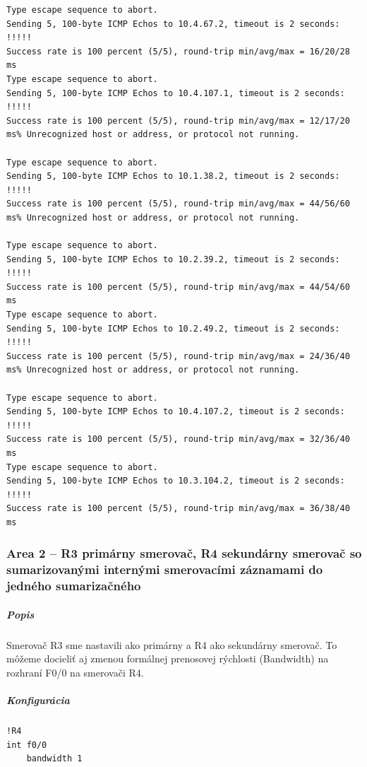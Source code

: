 \documentclass[12pt,twoside,a4paper]{article}
\begin{document}
{\begin{small}
\begin{verbatim}
Type escape sequence to abort.
Sending 5, 100-byte ICMP Echos to 10.4.67.2, timeout is 2 seconds:
!!!!!
Success rate is 100 percent (5/5), round-trip min/avg/max = 16/20/28 ms
Type escape sequence to abort.
Sending 5, 100-byte ICMP Echos to 10.4.107.1, timeout is 2 seconds:
!!!!!
Success rate is 100 percent (5/5), round-trip min/avg/max = 12/17/20 ms% Unrecognized host or address, or protocol not running.

Type escape sequence to abort.
Sending 5, 100-byte ICMP Echos to 10.1.38.2, timeout is 2 seconds:
!!!!!
Success rate is 100 percent (5/5), round-trip min/avg/max = 44/56/60 ms% Unrecognized host or address, or protocol not running.

Type escape sequence to abort.
Sending 5, 100-byte ICMP Echos to 10.2.39.2, timeout is 2 seconds:
!!!!!
Success rate is 100 percent (5/5), round-trip min/avg/max = 44/54/60 ms
Type escape sequence to abort.
Sending 5, 100-byte ICMP Echos to 10.2.49.2, timeout is 2 seconds:
!!!!!
Success rate is 100 percent (5/5), round-trip min/avg/max = 24/36/40 ms% Unrecognized host or address, or protocol not running.

Type escape sequence to abort.
Sending 5, 100-byte ICMP Echos to 10.4.107.2, timeout is 2 seconds:
!!!!!
Success rate is 100 percent (5/5), round-trip min/avg/max = 32/36/40 ms
Type escape sequence to abort.
Sending 5, 100-byte ICMP Echos to 10.3.104.2, timeout is 2 seconds:
!!!!!
Success rate is 100 percent (5/5), round-trip min/avg/max = 36/38/40 ms

\end{verbatim}
\end{small}
}



\subsubsection*{Area 2 – R3 primárny smerovač, R4 sekundárny smerovač so sumarizovanými internými smerovacími záznamami do jedného sumarizačného}
\subparagraph{Popis}
\subparagraph{}
Smerovač R3 sme nastavili ako primárny a R4 ako sekundárny smerovač. To môžeme docieliť aj zmenou formálnej prenosovej rýchlosti (Bandwidth) na rozhraní F0/0 na smerovači R4.

\subparagraph{Konfigurácia}
\noindent
{\selectfont
\begin{small}
\begin{verbatim}
!R4
int f0/0
    bandwidth 1

\end{verbatim}
\end{small}
}
\end{document}
